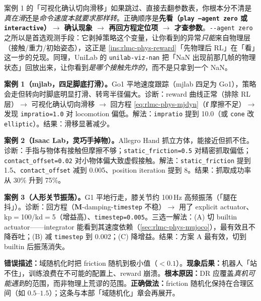 \begin{insight}\label{ins:rlmc-phys-seeit}
案例 1 的「可视化确认切向滑移」如果跳过、直接去翻参数表，你根本分不清是\emph{真在滑}还是\emph{命令速度本就要求那样转}。正确顺序是\textbf{先看（\texttt{play --agent zero} 或 \texttt{interactive}）$\to$ 确认现象 $\to$ 再回方程定位项 $\to$ 才查参数}。\verb|--agent zero| 之所以是首选观测手段：它剥掉策略这个变量，让你看到的异常\emph{只能}来自物理层（接触/重力/初始姿态），这正是 \cref{ins:rlmc-phys-reward}「先物理后 RL」在「看」这一步的兑现。同理，UniLab 的 \verb|unilab-viz-nan| 把「NaN 出现前那几帧的物理状态」回放出来，让你看到\emph{是哪个接触先炸的}，而不是只拿到一个 NaN。
\end{insight}

\textbf{案例 1（mjlab，四足脚底打滑）。}Go1 平地速度跟踪（mjlab 四足为 Go1），策略会走但转向时脚底明显打滑、转弯半径偏大。诊断：reward 曲线正常（排除 RL 层）$\to$ 可视化确认切向滑移 $\to$ 回方程 \eqref{eq:rlmc-phys-mjdyn}（$\mathbf f$ 摩擦不足）$\to$ 发现 \verb|impratio=1.0| 对 locomotion 偏低。解法：\verb|impratio| 提到 10.0（或 \verb|cone| 改 \verb|elliptic|）。结果：滑移显著减少。

\textbf{案例 2（Isaac Lab，灵巧手掉物）。}Allegro Hand 抓立方体，能接近但抓不住。诊断：手指与物体有接触但摩擦不够；\verb|static_friction=0.5| 对精密抓取偏低；\verb|contact_offset=0.02| 对小物体偏大致虚假接触。解法：\verb|static_friction| 提到 1.5、\verb|contact_offset| 减到 0.005、position iteration 提到 8。结果：抓取成功率从 30\% 升到 75\%。

\textbf{案例 3（人形关节振荡）。}G1 平地行走，膝关节约 100\,Hz 高频振荡（「腿在抖」）。诊断：回方程（$\mathbf{M}$-damping-\verb|timestep| 不稳）$\to$ 用了 explicit actuator、kp$=$100/kd$=$5（增益高）、\verb|timestep=0.005|。三选一解法：(A) 切 builtin actuator——integrator 能看到其速度依赖（\cref{sec:rlmc-phys-mujoco}），最有效且不降吞吐；(B) 减 \verb|timestep| 到 0.002；(C) 降增益。结果：方案 A 最有效，切到 builtin 后振荡消失。

\begin{pitfall}[在 DR 中把摩擦随机到不可能的范围]
\textbf{错误描述：}域随机化时把 friction 随机到极小值（$<0.1$）。\textbf{现象后果：}机器人「站不住」，训练浪费在不可能的配置上、reward 崩溃。\textbf{根本原因：}DR 应覆盖\emph{真机可能遇到}的范围，而非物理上荒谬的范围。\textbf{正确做法：}friction 随机化保持在合理区间（如 $0.5$--$1.5$）；这条与本部「域随机化」章会再展开。
\end{pitfall}

